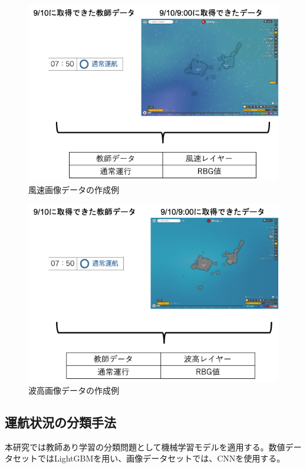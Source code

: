 \documentclass[twocolumn,twoside,9.5pt]{jsarticle}
\begin{document}
\begin{figure}[H]
 \centering
 \includegraphics[keepaspectratio, scale=0.3]{pic/wind_speed_data.png}
 \caption{風速画像データの作成例}
 \label{wind_img_data}
\end{figure}

\begin{figure}[H]
 \centering
 \includegraphics[keepaspectratio, scale=0.3]{pic/wave_height_data.png}
 \caption{波高画像データの作成例}
 \label{wave_value_data}
\end{figure}

\subsection{運航状況の分類手法}
本研究では教師あり学習の分類問題として機械学習モデルを適用する。数値データセットではLightGBMを用い、画像データセットでは、CNNを使用する。
\end{document}

